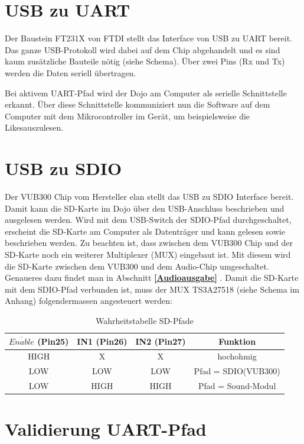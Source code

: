 \section{USB zu UART}

Der Baustein FT231X von FTDI stellt das Interface von USB zu UART bereit. Das ganze USB-Protokoll wird dabei auf dem Chip abgehandelt und es sind kaum zusätzliche Bauteile nötig (siehe Schema). Über zwei Pins (Rx und Tx) werden die Daten seriell übertragen.

Bei aktivem UART-Pfad wird der Dojo am Computer als serielle Schnittstelle erkannt. Über diese Schnittstelle kommuniziert nun die Software auf dem Computer mit dem Mikrocontroller im Gerät, um beispielsweise die \flq Likes\frq  auszulesen.


\section{USB zu SDIO}

Der VUB300 Chip vom Hersteller elan stellt das USB zu SDIO Interface bereit. Damit kann die SD-Karte im Dojo über den USB-Anschluss beschrieben und ausgelesen werden. Wird mit dem USB-Switch der SDIO-Pfad durchgeschaltet, erscheint die SD-Karte am Computer als Datenträger und kann gelesen sowie beschrieben werden. Zu beachten ist, dass zwischen dem VUB300 Chip und der SD-Karte noch ein weiterer Multiplexer (MUX) eingebaut ist. Mit diesem wird die SD-Karte zwischen dem VUB300 und dem Audio-Chip umgeschaltet. Genaueres dazu findet man in Abschnitt \textbf{\ref{Audioausgabe} }.
Damit die SD-Karte mit dem SDIO-Pfad verbunden ist, muss der MUX TS3A27518 (siehe Schema im Anhang) folgendermassen angesteuert werden:

\begin{table}[h]
	\centering
	\begin{tabular}{|c|c|c|c|} 
		$\overline{Enable}$ (Pin25) & IN1 (Pin26) & IN2 (Pin27) & Funktion \\ 
		\hline 
		HIGH & X & X & hochohmig \\ 
		\hline 
		LOW & LOW & LOW & Pfad = SDIO(VUB300) \\ 
		\hline 
		LOW & HIGH & HIGH & Pfad = Sound-Modul \\ 
	\end{tabular} 
	\caption{Wahrheitstabelle SD-Pfade}
	\label{truth_table_sd}
\end{table}




\section{Validierung UART-Pfad}

